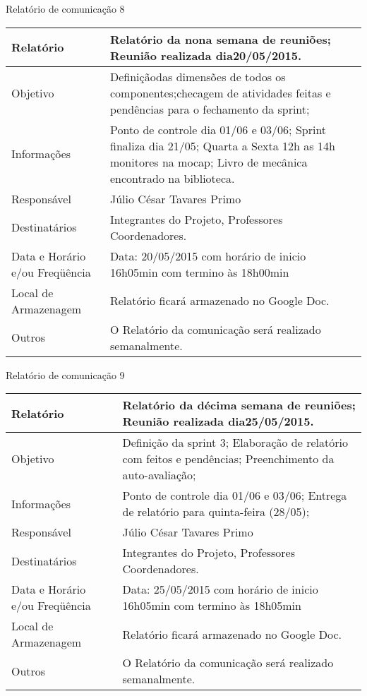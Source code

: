 \begin{center}
{\large Relatório de comunicação 8}
\begin{table}[h]
\begin{tabular}{|p{6cm}|p{9cm}|}\hline
Relatório&Relatório da nona semana de reuniões; Reunião realizada dia20/05/2015.\\ \hline
Objetivo&Definiçãodas dimensões de todos os componentes;checagem de atividades feitas e pendências para o fechamento da sprint; \\ \hline
Informações&Ponto de controle dia 01/06 e 03/06;
Sprint finaliza dia 21/05;
Quarta a Sexta 12h as 14h monitores na mocap;
Livro de mecânica encontrado na biblioteca.\\ \hline
Responsável&Júlio César Tavares Primo\\ \hline
Destinatários&Integrantes do Projeto, Professores Coordenadores.\\ \hline
Data e Horário e/ou Freqüência&Data: 20/05/2015 com horário de inicio 16h05min com termino às 18h00min\\ \hline
Local de Armazenagem&Relatório ficará armazenado no Google Doc.\\ \hline
Outros&O Relatório da comunicação será realizado semanalmente.\\ \hline

\end{tabular}
\end{table}
\FloatBarrier

{\large Relatório de comunicação 9}
\begin{table}[h]
\begin{tabular}{|p{6cm}|p{9cm}|}\hline
Relatório&Relatório da décima semana de reuniões; Reunião realizada dia25/05/2015.\\ \hline
Objetivo&Definição da sprint 3;
Elaboração de relatório com feitos e pendências;
Preenchimento da auto-avaliação;\\ \hline
Informações	& Ponto de controle dia 01/06 e 03/06;
Entrega de relatório para quinta-feira (28/05);\\ \hline
Responsável&Júlio César Tavares Primo\\ \hline
Destinatários&Integrantes do Projeto, Professores Coordenadores.\\ \hline
Data e Horário e/ou Freqüência&Data: 25/05/2015 com horário de inicio 16h05min com termino às 18h05min\\ \hline
Local de Armazenagem&Relatório ficará armazenado no Google Doc.\\ \hline
Outros&O Relatório da comunicação será realizado semanalmente.\\ \hline
\end{tabular}
\end{table}
\FloatBarrier


\end{center}
